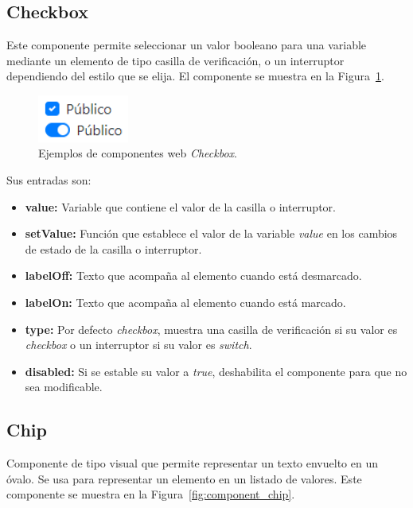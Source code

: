 \documentclass[a4paper, 12pt]{book}
\begin{document}
    \subsection{Checkbox}
    \label{subsec:wc_checkbox}
    Este componente permite seleccionar un valor booleano para una variable mediante un elemento de tipo casilla de verificación, o un interruptor dependiendo del estilo que se elija.
    El componente se muestra en la Figura~\ref{fig:component_checkbox}.

    \begin{figure}
        \centering
        \includegraphics[width=3cm, keepaspectratio]{img/Checkbox.PNG}
        \caption{Ejemplos de componentes web \emph{Checkbox}.}\label{fig:component_checkbox}
    \end{figure}

    Sus entradas son:

    \begin{itemize}
        \item \textbf{value:} Variable que contiene el valor de la casilla o interruptor.
        \item \textbf{setValue:} Función que establece el valor de la variable \emph{value} en los cambios de estado de la casilla o interruptor.
        \item \textbf{labelOff:} Texto que acompaña al elemento cuando está desmarcado.
        \item \textbf{labelOn:} Texto que acompaña al elemento cuando está marcado.
        \item \textbf{type:} Por defecto \emph{checkbox}, muestra una casilla de verificación si su valor es \emph{checkbox} o un interruptor si su valor es \emph{switch}.
        \item \textbf{disabled:} Si se estable su valor a \emph{true}, deshabilita el componente para que no sea modificable.
    \end{itemize}

    \subsection{Chip}
    \label{subsec:wc_chip}
    Componente de tipo visual que permite representar un texto envuelto en un óvalo. Se usa para representar un elemento en un listado de valores.
    Este componente se muestra en la Figura~\ref{fig:component_chip}.
\end{document}
